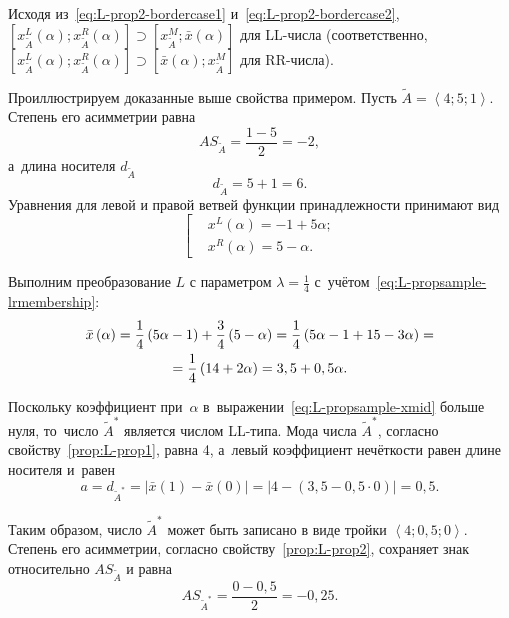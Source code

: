 Исходя из~\eqref{eq:L-prop2-bordercase1} и~\eqref{eq:L-prop2-bordercase2}, $\left[ x_{\tilde A}^{L}(\alpha );x_{\tilde A}^{R}(\alpha ) \right]\supset \left[ x_{\tilde A}^{M};\bar{x}(\alpha ) \right]$ для LL-числа (соответственно, $\left[ x_{\tilde A}^{L}(\alpha ); x_{\tilde A}^{R}(\alpha ) \right] \supset \left[ \bar{x}(\alpha ); x_{\tilde A}^{M} \right]$ для RR-числа).

Проиллюстрируем доказанные выше свойства примером. Пусть $\tilde{A}=\left\langle 4;5;1 \right\rangle $. Степень его асимметрии равна
\begin{equation*}
  AS_{\tilde A}=\frac{1-5}{2}=-2,
\end{equation*}
а~длина носителя $d_{\tilde A}$
\begin{equation*}
  d_{\tilde A}=5+1=6.
\end{equation*}
Уравнения для левой и правой ветвей функции принадлежности принимают вид
\begin{equation}
\label{eq:L-propsample-lrmembership}
  \left[ \begin{aligned}
    & {{x}^{L}}\left( \alpha  \right)=-1+5\alpha; \\ 
    & {{x}^{R}}\left( \alpha  \right)=5-\alpha.
  \end{aligned} \right.
\end{equation}

Выполним преобразование $L$ с параметром $\displaystyle \lambda =\frac{1}{4}$ с~учётом~\eqref{eq:L-propsample-lrmembership}:
\begin{gather}
  \bar{x}\left( \alpha  \right)=\frac{1}{4}\left( 5\alpha -1 \right)+\frac{3}{4}\left( 5-\alpha  \right)=\frac{1}{4}\left( 5\alpha -1+15-3\alpha  \right)=\notag \\
  \label{eq:L-propsample-xmid}
  = \frac{1}{4}\left( 14+2\alpha  \right)=3,5+0,5\alpha.
\end{gather}

Поскольку коэффициент при~$\alpha $ в~выражении~\eqref{eq:L-propsample-xmid} больше нуля, то~число $\tilde A^{*}$ является числом LL-типа. Мода числа $\tilde A^{*}$, согласно свойству~\ref{prop:L-prop1}, равна 4, а~левый коэффициент нечёткости равен длине носителя и~равен
\begin{equation*}
  a=d_{\tilde A^{*}}=\left| \bar{x}\left( 1 \right)-\bar{x}\left( 0 \right) \right|=\left| 4-\left( 3,5-0,5\cdot 0 \right) \right|=0,5.
\end{equation*}

Таким образом, число $\tilde A^{*}$ может быть записано в виде тройки $\left\langle 4;0,5;0 \right\rangle $. Степень его асимметрии, согласно свойству~\ref{prop:L-prop2}, сохраняет знак относительно $AS_{\tilde A}$ и равна
\begin{equation*}
  AS_{\tilde A^{*}}=\frac{0-0,5}{2}=-0,25.
\end{equation*}

